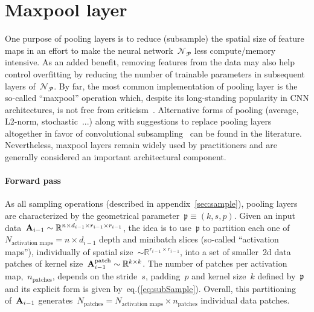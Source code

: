 \documentclass{article}
\begin{document}
\section{Maxpool layer}
\label{sec:maxpool}

One purpose of pooling layers is to reduce (subsample) the spatial size of feature maps in an effort to make the neural network~$\mathcal{N}_\mathbfcal{P}$ less compute/memory intensive.  As an added benefit, removing features from the data may also help control overfitting by reducing the number of trainable parameters in subsequent layers of~$\mathcal{N}_\mathbfcal{P}$.  By far, the most common implementation of pooling layer is the so-called ``maxpool'' operation which, despite its long-standing popularity in CNN architectures, is not free from criticism~\cite{maxPoolcontroversy}.  Alternative forms of pooling (average, L2-norm, stochastic~\cite{stochasticPool}...) along with suggestions to replace pooling layers altogether in favor of convolutional subsampling~\cite{allConv} can be found in the literature.  Nevertheless, maxpool layers remain widely used by practitioners and are generally considered an important architectural component.

\paragraph{Forward pass}  As all sampling operations (described in appendix~\ref{sec:sample}), pooling layers are characterized by the geometrical parameter~$\mathfrak{p} \equiv \left(k, s, p \right)$.  Given an input data~${\bf A}_{i-1} \sim \mathbb{R}^{n\times d_{i-1} \times r_{i-1} \times r_{i-1} }$, the idea is to use~$\mathfrak{p}$ to partition each one of~$N_\text{activation maps} = n\times d_{i-1}$ depth and minibatch slices (so-called ``activation maps''), individually of spatial size~$\sim \mathbb{R}^{r_{i-1} \times r_{i-1}}$, into a set of smaller~2d data patches of kernel size~${\bf A}_{i-1}^\text{patch} \sim \mathbb{R}^{k \times k}$.  The number of patches per activation map,~$n_\text{patches}$, depends on the stride~$s$, padding~$p$ and kernel size~$k$ defined by~$\mathfrak{p}$ and its explicit form is given by~eq.(\ref{eq:subSample}). Overall, this partitioning of~${\bf A}_{i-1}$ generates~$N_\text{patches} = N_\text{activation maps} \times n_\text{patches}$ individual data patches. \\

 \\
\end{document}
